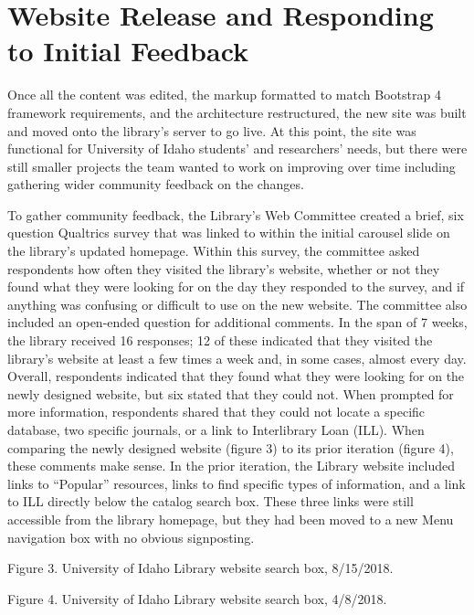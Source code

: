 \documentclass{book}
\begin{document}
\hypertarget{website-release-and-responding-to-initial-feedback}{%
\section{Website Release and Responding to Initial
Feedback}\label{website-release-and-responding-to-initial-feedback}}

Once all the content was edited, the markup formatted to match Bootstrap 4
framework requirements, and the architecture restructured, the new site was
built and moved onto the library's server to go live. At this point, the site
was functional for University of Idaho students' and researchers' needs, but
there were still smaller projects the team wanted to work on improving over
time including gathering wider community feedback on the changes.

To gather community feedback, the Library's Web Committee created a brief, six
question Qualtrics survey that was linked to within the initial carousel slide
on the library's updated homepage. Within this survey, the committee asked
respondents how often they visited the library's website, whether or not they
found what they were looking for on the day they responded to the survey, and
if anything was confusing or difficult to use on the new website. The
committee also included an open-ended question for additional comments. In the
span of 7 weeks, the library received 16 responses; 12 of these indicated that
they visited the library's website at least a few times a week and, in some
cases, almost every day. Overall, respondents indicated that they found what
they were looking for on the newly designed website, but six stated that they
could not. When prompted for more information, respondents shared that they
could not locate a specific database, two specific journals, or a link to
Interlibrary Loan (ILL). When comparing the newly designed website (figure 3)
to its prior iteration (figure 4), these comments make sense. In the prior
iteration, the Library website included links to ``Popular'' resources, links
to find specific types of information, and a link to ILL directly below the
catalog search box. These three links were still accessible from the library
homepage, but they had been moved to a new Menu navigation box with no obvious
signposting.

Figure 3. University of Idaho Library website search box, 8/15/2018.

Figure 4. University of Idaho Library website search box, 4/8/2018.
\end{document}
